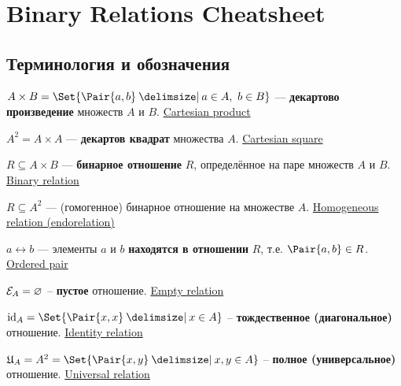 \documentclass[a4paper,10pt]{article}
\begin{document}
\setcounter{section}{1}
\section{Binary Relations Cheatsheet}

\subsection{Терминология и обозначения}

\begin{terms}
    \item $A \times B = \Set{\Pair{a,b} \given a \in A,~ b \in B}$ --- \textbf{декартово произведение} множеств $A$ и $B$.
    \hfill\href{https://en.wikipedia.org/wiki/Cartesian_product}{Cartesian product}

    \item $A^2 = A \times A$ --- \textbf{декартов квадрат} множества $A$.
    \hfill\href{https://en.wikipedia.org/wiki/Cartesian_product\#n-ary_Cartesian_power}{Cartesian square}

    \item $R \subseteq A \times B$ --- \textbf{бинарное отношение} $R$, определённое на паре множеств $A$ и $B$.
    \hfill\href{https://en.wikipedia.org/wiki/Binary_relation}{Binary relation}

    \item $R \subseteq A^2$ --- (гомогенное) бинарное отношение на множестве $A$.
    \hfill\href{https://en.wikipedia.org/wiki/Homogeneous_relation}{Homogeneous relation (endorelation)}

    \item $a \rel b$ --- элементы $a$ и $b$ \textbf{находятся в отношении} $R$, т.е. $\Pair{a,b} \in R$.
    \hfill\href{https://en.wikipedia.org/wiki/Ordered_pair}{Ordered pair}

    \item $\mathcal{E}_{A} = \varnothing$ -- \textbf{пустое} отношение.
    \hfill\href{https://en.wikipedia.org/wiki/Homogeneous_relation#Particular_homogeneous_relations}{Empty relation}

    \item $\idrel{A} = \Set{\Pair{x,x} \given x \in A}$ -- \textbf{тождественное (диагональное)} отношение.
    \hfill\href{https://en.wikipedia.org/wiki/Homogeneous_relation#Particular_homogeneous_relations}{Identity relation}

    \item $\universalrel{A} = A^2 = \Set{\Pair{x,y} \given x,y \in A}$ -- \textbf{полное (универсальное)} отношение.
    \hfill\href{https://en.wikipedia.org/wiki/Homogeneous_relation#Particular_homogeneous_relations}{Universal relation}

\end{terms}
\end{document}
